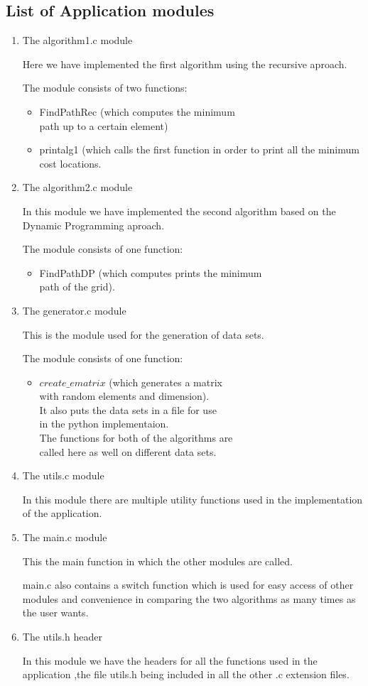 \documentclass{article}
\begin{document}
\subsection{List of Application modules}
\begin{enumerate}
  \item The algorithm1.c module
  \par Here we have implemented the first algorithm using the recursive aproach.
  \par The module consists of two functions:
  \begin{itemize}
  \item FindPathRec (which computes the minimum \\path up to a certain element)
  \item printalg1 (which calls the first function in order to print all the minimum cost locations.
\end{itemize}
  \item The algorithm2.c module
  \par In this module we have implemented the second algorithm based on the Dynamic Programming aproach.
  \par The module consists of one function:
  \begin{itemize}
  \item FindPathDP (which computes prints the minimum \\path of the grid).
  
\end{itemize}
  \item The generator.c module
  \par This is the module used for the generation of data sets.
  \par The module consists of one function:
  \begin{itemize}
  \item $create\_ematrix$ (which generates a matrix \\with random elements and dimension).\\It also puts the data sets in a file for use \\in the python implementaion.\\
  The functions for both of the algorithms are\\ called here as well on different data sets.
\end{itemize}
\newpage
\item The utils.c module
\par In this module there are multiple utility functions used in the implementation of the application.
\item The main.c module
\par This the main function in which the other modules are called.
\par main.c also contains a switch function which is used for easy access of other modules and convenience in comparing the two algorithms as many times as the user wants.
\item The utils.h header
\par In this module we have the headers for all the functions used in the application ,the file utils.h being included in all the other .c extension files.
\end{enumerate}
\newpage 
\end{document}
